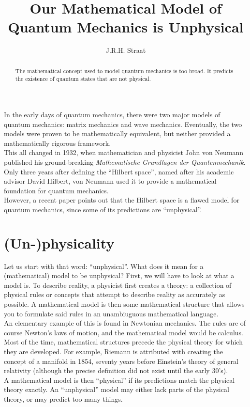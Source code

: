\documentclass[12pt]{article}
\title{Our Mathematical Model of Quantum Mechanics is Unphysical}      %
\author{J.R.H. Straat}
\date{}
\begin{document}
\maketitle
%
\begin{abstract}
	The mathematical concept used to model quantum mechanics is too broad. It predicts the existence of quantum states that are not physical.
\end{abstract}
%
\begin{multicols}{2}
    In the early days of quantum mechanics, there were two major models of quantum mechanics: matrix mechanics and wave mechanics. Eventually, the two models were proven to be mathematically equivalent, but neither provided a mathematically rigorous framework.\\
    This all changed in 1932, when mathematician and physicist John von Neumann published his ground-breaking \textit{Mathematische Grundlagen der Quantenmechanik}\cite{von_neumann_mathematische_1996}. Only three years after defining the ``Hilbert space'', named after his academic advisor David Hilbert, von Neumann used it to provide a mathematical foundation for quantum mechanics.\\
    However, a recent paper\cite{carcassi_unphysicality_2023} points out that the Hilbert space is a flawed model for quantum mechanics, since some of its predictions are ``unphysical''.
    \section*{(Un-)physicality}
    Let us start with that word: ``unphysical''. What does it mean for a (mathematical) model to be unphysical? First, we will have to look at what a model is. To describe reality, a physicist first creates a theory: a collection of physical rules or concepts that attempt to describe reality as accurately as possible. A mathematical model is then some mathematical structure that allows you to formulate said rules in an unambiuguous mathematical language.\\
    An elementary example of this is found in Newtonian mechanics. The rules are of course Newton's laws of motion, and the mathematical model would be calculus.\\
    Most of the time, mathematical structures precede the physical theory for which they are developed. For example, Riemann is attributed with creating the concept of a manifold in 1854, seventy years before Einstein's theory of general relativity (although the precise definition did not exist until the early 30's).\\
    A mathematical model is then ``physical'' if its predictions match the physical theory exactly. An ``unphysical'' model may either lack parts of the physical theory, or may predict too many things.

\end{multicols}
\end{document}
